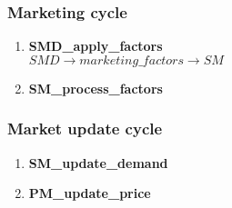 \documentclass[11pt]{article}
\begin{document}
\subsubsection{Marketing cycle}
\begin{enumerate}
	\item \textbf{SMD\_apply\_factors} \\
	$ SMD \rightarrow marketing\_factors \rightarrow SM $
	\item \textbf{SM\_process\_factors}
\end{enumerate}

\subsubsection{Market update cycle}
\begin{enumerate}
	\item \textbf{SM\_update\_demand}
	\item \textbf{PM\_update\_price}
\end{enumerate}
\end{document}
